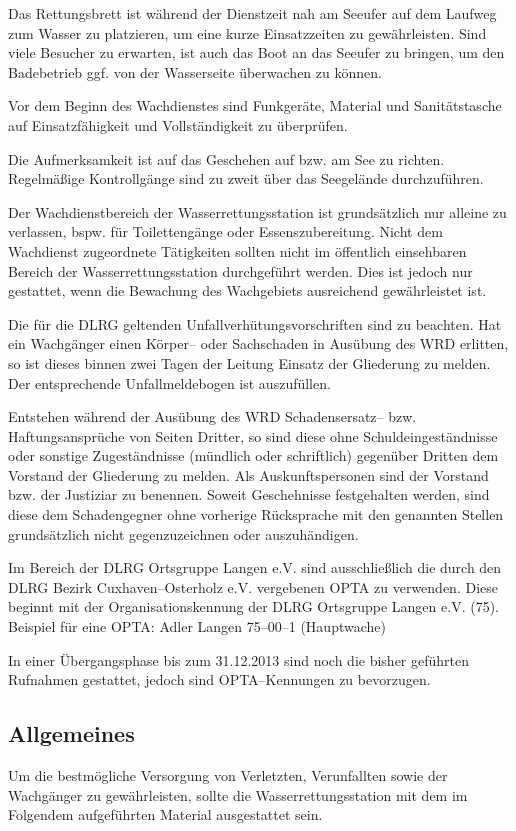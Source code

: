 Das Rettungsbrett ist während der Dienstzeit nah am Seeufer auf dem Laufweg zum Wasser zu platzieren, um eine kurze Einsatzzeiten zu gewährleisten. Sind viele Besucher zu erwarten, ist auch das Boot an das Seeufer zu bringen, um den Badebetrieb ggf. von der Wasserseite überwachen zu können.

Vor dem Beginn des Wachdienstes sind Funkgeräte, Material und Sanitätstasche auf Einsatzfähigkeit und Vollständigkeit zu überprüfen.

Die Aufmerksamkeit ist auf das Geschehen auf bzw. am See zu richten. Regelmäßige Kontrollgänge sind zu zweit über das Seegelände durchzuführen. 

Der Wachdienstbereich der Wasserrettungsstation ist grundsätzlich nur alleine zu verlassen, bspw. für Toilettengänge oder Essenszubereitung. Nicht dem Wachdienst zugeordnete Tätigkeiten sollten nicht im öffentlich einsehbaren Bereich der Wasserrettungsstation durchgeführt werden. Dies ist jedoch nur gestattet, wenn die Bewachung des Wachgebiets ausreichend gewährleistet ist. 

Die für die DLRG geltenden Unfallverhütungsvorschriften sind zu beachten. Hat ein Wachgänger einen Körper-- oder Sachschaden in Ausübung des WRD erlitten, so ist dieses binnen zwei Tagen der Leitung Einsatz der Gliederung zu melden. Der entsprechende Unfallmeldebogen ist auszufüllen.

Entstehen während der Ausübung des WRD Schadensersatz-- bzw. Haftungsansprüche von Seiten Dritter, so sind diese ohne Schuldeingeständnisse oder sonstige Zugeständnisse (mündlich oder schriftlich) gegenüber Dritten dem Vorstand der Gliederung zu melden. Als Auskunftspersonen sind der Vorstand bzw. der Justiziar zu benennen. Soweit Geschehnisse festgehalten werden, sind diese dem Schadengegner ohne vorherige Rücksprache mit den genannten Stellen grundsätzlich nicht gegenzuzeichnen oder auszuhändigen.

Im Bereich der DLRG Ortsgruppe Langen e.V. sind ausschließlich die durch den DLRG Bezirk Cuxhaven--Osterholz e.V. vergebenen OPTA zu verwenden. Diese beginnt mit der Organisationskennung der DLRG Ortsgruppe Langen e.V. (75). Beispiel für eine OPTA: \glqq Adler Langen 75--00--1\grqq{} (Hauptwache)

In einer Übergangsphase bis zum 31.12.2013 sind noch die bisher geführten Rufnahmen gestattet, jedoch sind OPTA--Kennungen zu bevorzugen.

\subsection*{Allgemeines}
Um die bestmögliche Versorgung von Verletzten, Verunfallten sowie der Wachgänger zu gewährleisten, sollte die Wasserrettungsstation mit dem im Folgendem aufgeführten Material ausgestattet sein. 

